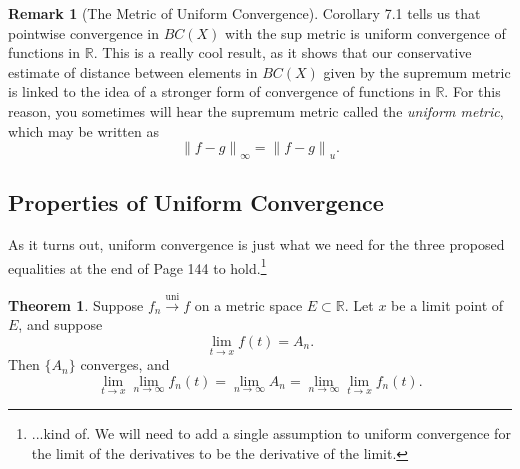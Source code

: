 \documentclass{article}
\newcommand{\R}{\mathbb{R}}
\newcommand{\norm}[1]{\left\lVert#1\right\rVert}
\newcommand{\uni}{\overset{\text{uni}}{\to}}
\theoremstyle{definition}
\newtheorem{theorem}{Theorem}[section]
\newtheorem{remark}{Remark}[section]
\begin{document}
	\begin{remark}[The Metric of Uniform Convergence]
		Corollary 7.1 tells us that pointwise convergence in $ BC(X) $ with the sup metric is uniform convergence of functions in $ \R $. This is a really cool result, as it shows that our conservative estimate of distance between elements in $ BC(X) $ given by the supremum metric is linked to the idea of a stronger form of convergence of functions in $ \R $. For this reason, you sometimes will hear the supremum metric called the \textit{\color{red}uniform metric}, which may be written as $$ \norm{f-g}_\infty=\norm{f-g}_u.$$ 
	\end{remark}
	
	\subsection{Properties of Uniform Convergence}
	As it turns out, uniform convergence is just what we need for the three proposed equalities at the end of Page 144 to hold.\footnote{...kind of. We will need to add a single assumption to uniform convergence for the limit of the derivatives to be the derivative of the limit.}
	\begin{theorem}
		Suppose $ f_n\uni f $ on a metric space $ E\subset \R $. Let $ x $ be a limit point of $ E $, and suppose $$\lim\limits_{t\to x}f(t)=A_n .$$ Then $ \{A_n\} $ converges, and $$ \lim\limits_{t\to x}\lim\limits_{n\to\infty}f_n(t)=\lim\limits_{n\to\infty} A_n=\lim\limits_{n\to\infty} \lim\limits_{t\to x}f_n(t). $$
	\end{theorem}
\end{document}
